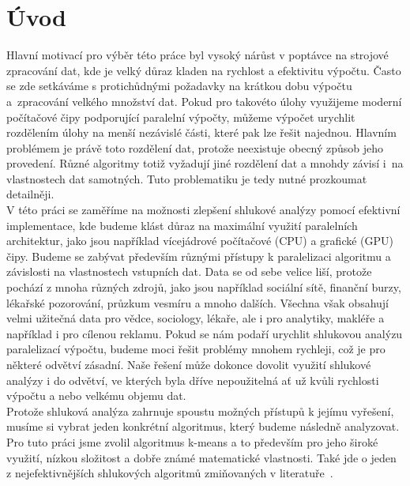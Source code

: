 \pagestyle{plain}
\setcounter{page}{1}

\chapter{Úvod}
Hlavní motivací pro výběr této práce byl vysoký nárůst v poptávce na strojové zpracování dat, kde je velký důraz kladen na rychlost a efektivitu výpočtu. Často se zde setkáváme s protichůdnými požadavky na krátkou dobu výpočtu a~zpracování velkého množství dat.
Pokud pro takovéto úlohy využijeme moderní počítačové čipy podporující paralelní výpočty, můžeme výpočet urychlit rozdělením úlohy na menší nezávislé části, které pak lze řešit najednou. Hlavním problémem je právě toto rozdělení dat, protože neexistuje obecný způsob jeho provedení. Různé algoritmy totiž vyžadují jiné rozdělení dat a mnohdy závisí i~na vlastnostech dat samotných. Tuto problematiku je tedy nutné prozkoumat detailněji.\\

V této práci se zaměříme na možnosti zlepšení shlukové analýzy pomocí efektivní implementace, kde budeme klást důraz na maximální využití paralelních architektur, jako jsou například vícejádrové počítačové (CPU) a grafické (GPU) čipy. Budeme se zabývat především různými přístupy k paralelizaci algoritmu a závislosti na vlastnostech vstupních dat.
Data se od sebe velice liší, protože pochází z mnoha různých zdrojů, jako jsou 	například sociální sítě, finanční burzy, lékařské pozorování, průzkum vesmíru a mnoho dalších. Všechna však obsahují velmi užitečná data pro vědce, sociology, lékaře, ale i pro analytiky, makléře a například i pro cílenou reklamu.
Pokud se nám podaří urychlit shlukovou analýzu paralelizací výpočtu, budeme moci řešit problémy mnohem rychleji, což je pro některé odvětví zásadní. Naše řešení může dokonce dovolit využití shlukové analýzy i do odvětví, ve kterých byla dříve nepoužitelná ať už kvůli rychlosti výpočtu a nebo velkému objemu dat.\\

Protože shluková analýza zahrnuje spoustu možných přístupů k jejímu vy\-ře\-še\-ní, musíme si vybrat jeden konkrétní algoritmus, který budeme následně analyzovat. Pro tuto práci jsme zvolil algoritmus k-means a to především pro jeho široké využití, nízkou složitost a dobře známé matematické vlastnosti. Také jde o jeden z nejefektivnějších shlukových algoritmů zmiňovaných v literatuře~\cite{Aggarwal13}.\\

